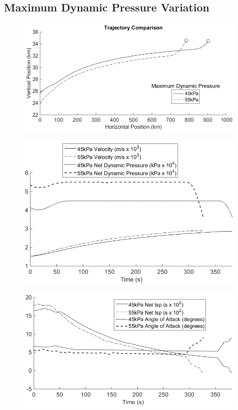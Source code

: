 \subsection{Maximum Dynamic Pressure Variation}
\begin{figure}
\centering
\includegraphics[width=0.9\linewidth]{figures/5_Ascent/Multipleq}
\caption{}
\label{fig:Multipleq}
\end{figure}
\begin{figure}
\centering
\includegraphics[width=0.8\linewidth]{figures/5_Ascent/MultipleqAero}
\caption{}
\label{fig:MultipleqAero}
\end{figure}
\begin{figure}
\centering
\includegraphics[width=0.8\linewidth]{figures/5_Ascent/Multipleq-Vehicle}
\caption{}
\label{fig:Multipleq-Vehicle}
\end{figure}


